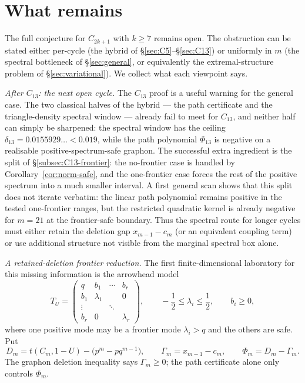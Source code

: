 \documentclass[11pt]{article}
\begin{document}
\section{What remains}\label{sec:remains}

The full conjecture for $C_{2k+1}$ with $k\ge7$ remains open.  The obstruction can be stated either per-cycle (the hybrid of \S\ref{sec:C5}--\S\ref{sec:C13}) or uniformly in $m$ (the spectral bottleneck of \S\ref{sec:general}, or equivalently the extremal-structure problem of \S\ref{sec:variational}).  We collect what each viewpoint says.

\medskip\noindent\emph{After $C_{13}$: the next open cycle.}
The $C_{13}$ proof is a useful warning for the general case.  The two classical halves of the hybrid --- the path certificate and the triangle-density spectral window --- already fail to meet for $C_{13}$, and neither half can simply be sharpened: the spectral window has the ceiling $\delta_{13}=0.0155929\ldots<0.019$, while the path polynomial $\Phi_{13}$ is negative on a realisable positive-spectrum-safe graphon.  The successful extra ingredient is the split of \S\ref{subsec:C13-frontier}: the no-frontier case is handled by Corollary~\ref{cor:norm-safe}, and the one-frontier case forces the rest of the positive spectrum into a much smaller interval.  A first general scan shows that this split does not iterate verbatim: the linear path polynomial remains positive in the tested one-frontier ranges, but the restricted quadratic kernel is already negative for $m=21$ at the frontier-safe boundary.  Thus the spectral route for longer cycles must either retain the deletion gap $x_{m-1}-c_m$ (or an equivalent coupling term) or use additional structure not visible from the marginal spectral box alone.

\medskip\noindent\emph{A retained-deletion frontier reduction.}
The first finite-dimensional laboratory for this missing information is the arrowhead model
\[
        T_U=
        \begin{pmatrix}
        q&b_1&\cdots&b_r\\
        b_1&\lambda_1&&0\\
        \vdots&&\ddots&\\
        b_r&0&&\lambda_r
        \end{pmatrix},
        \qquad
        -\frac12\le\lambda_i\le\frac12,\qquad b_i\ge0,
\]
where one positive mode may be a frontier mode $\lambda_i>q$ and the others are safe.  Put
\[
        D_m=t(C_m,1-U)-\bigl(p^m-pq^{m-1}\bigr),
        \qquad
        \Gamma_m=x_{m-1}-c_m,
        \qquad
        \Phi_m=D_m-\Gamma_m .
\]
The graphon deletion inequality says $\Gamma_m\ge0$; the path certificate alone only controls $\Phi_m$.
\end{document}
